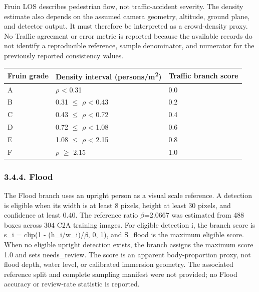 \documentclass[pdflatex,sn-mathphys-ay]{sn-jnl}
\begin{document}
Fruin LOS describes pedestrian flow, not traffic-accident severity. The density estimate also depends on the assumed camera geometry, altitude, ground plane, and detector output. It must therefore be interpreted as a crowd-density proxy. No Traffic agreement or error metric is reported because the available records do not identify a reproducible reference, sample denominator, and numerator for the previously reported consistency values.
\vspace{8pt}


\begin{center}
\small
\renewcommand{\arraystretch}{1.15}
\setlength{\tabcolsep}{3pt}
\begin{tabularx}{\textwidth}{|X|X|X|}\hline
Fruin grade & Density interval (persons/m\textsuperscript{2}) & Traffic branch score \\ \hline
A & $\rho$ \textless{} 0.31 & 0.0 \\ \hline
B & 0.31 $\leq$ $\rho$ \textless{} 0.43 & 0.2 \\ \hline
C & 0.43 $\leq$ $\rho$ \textless{} 0.72 & 0.4 \\ \hline
D & 0.72 $\leq$ $\rho$ \textless{} 1.08 & 0.6 \\ \hline
E & 1.08 $\leq$ $\rho$ \textless{} 2.15 & 0.8 \\ \hline
F & $\rho$ $\geq$ 2.15 & 1.0 \\ \hline
\end{tabularx}
\end{center}

\subsubsection*{3.4.4. Flood}

The Flood branch uses an upright person as a visual scale reference. A detection is eligible when its width is at least 8 pixels, height at least 30 pixels, and confidence at least 0.40. The reference ratio $\beta$=2.0667 was estimated from 488 boxes across 304 C2A training images. For eligible detection i, the branch score is s\_i = clip(1 - (h\_i/w\_i)/$\beta$, 0, 1), and S\_flood is the maximum eligible score. When no eligible upright detection exists, the branch assigns the maximum score 1.0 and sets needs\_review. The score is an apparent body-proportion proxy, not flood depth, water level, or calibrated immersion geometry. The associated reference split and complete sampling manifest were not provided; no Flood accuracy or review-rate statistic is reported.
\end{document}
